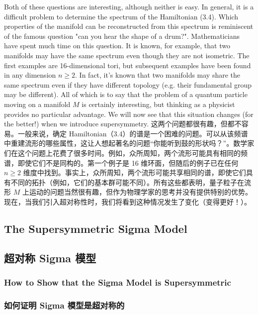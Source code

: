 \documentclass{ctexart}
\begin{document}
\begin{paracol}{2}
Both of these questions are interesting, although neither is easy. In general, it is a diﬃcult problem to determine the spectrum of the Hamiltonian (3.4). Which properties of the manifold can be reconstructed from this spectrum is reminiscent of the famous question "can you hear the shape of a drum?". Mathematicians have spent much time on this question. It is known, for example, that two manifolds may have the same spectrum even though they are not isometric. The first examples are 16-dimensional tori, but subsequent examples have been found in any dimension $n \geq 2$. In fact, it’s known that two manifolds may share the same spectrum even if they have different topology (e.g. their fundamental group may be different). All of which is to say that the problem of a quantum particle moving on a manifold $M$ is certainly interesting, but thinking as a physicist provides no particular advantage. We will now see that this situation changes (for the better!) when we introduce supersymmetry.
\switchcolumn
这两个问题都很有趣，但都不容易。一般来说，确定 Hamiltonian（3.4）的谱是一个困难的问题。可以从该频谱中重建流形的哪些属性，这让人想起著名的问题“你能听到鼓的形状吗？”。数学家们在这个问题上花费了很多时间。例如，众所周知，两个流形可能具有相同的频谱，即使它们不是同构的。第一个例子是 16 维环面，但随后的例子已在任何 $n \geq 2$ 维度中找到。事实上，众所周知，两个流形可能共享相同的谱，即使它们具有不同的拓扑（例如，它们的基本群可能不同）。所有这些都表明，量子粒子在流形 $M$ 上运动的问题当然很有趣，但作为物理学家的思考并没有提供特别的优势。现在，当我们引入超对称性时，我们将看到这种情况发生了变化（变得更好！）。
\switchcolumn*

\subsection{The Supersymmetric Sigma Model}
\switchcolumn
\subsection*{超对称 Sigma 模型}
\switchcolumn*

\subsubsection{How to Show that the Sigma Model is Supersymmetric}
\switchcolumn
\subsubsection*{如何证明 Sigma 模型是超对称的}
\switchcolumn*


\end{paracol}
\end{document}
